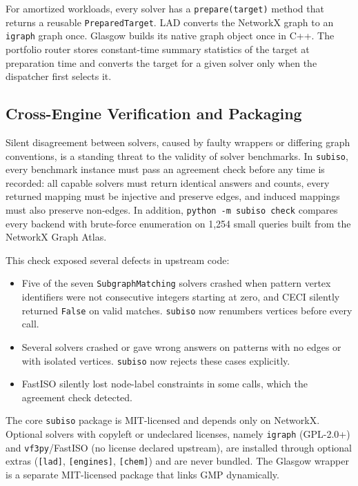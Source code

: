 \documentclass[11pt,a4paper]{article}
\begin{document}
For amortized workloads, every solver has a \texttt{prepare(target)} method that returns a reusable \texttt{PreparedTarget}. LAD converts the NetworkX graph to an \texttt{igraph} graph once. Glasgow builds its native graph object once in C++. The portfolio router stores constant-time summary statistics of the target at preparation time and converts the target for a given solver only when the dispatcher first selects it.

\subsection{Cross-Engine Verification and Packaging}

Silent disagreement between solvers, caused by faulty wrappers or differing graph conventions, is a standing threat to the validity of solver benchmarks. In \texttt{subiso}, every benchmark instance must pass an agreement check before any time is recorded: all capable solvers must return identical answers and counts, every returned mapping must be injective and preserve edges, and induced mappings must also preserve non-edges. In addition, \texttt{python -m subiso check} compares every backend with brute-force enumeration on 1,254 small queries built from the NetworkX Graph Atlas.

This check exposed several defects in upstream code:
\begin{itemize}
    \item Five of the seven \texttt{SubgraphMatching} solvers crashed when pattern vertex identifiers were not consecutive integers starting at zero, and CECI silently returned \texttt{False} on valid matches. \texttt{subiso} now renumbers vertices before every call.
    \item Several solvers crashed or gave wrong answers on patterns with no edges or with isolated vertices. \texttt{subiso} now rejects these cases explicitly.
    \item FastISO silently lost node-label constraints in some calls, which the agreement check detected.
\end{itemize}

The core \texttt{subiso} package is MIT-licensed and depends only on NetworkX. Optional solvers with copyleft or undeclared licenses, namely \texttt{igraph} (GPL-2.0+) and \texttt{vf3py}/FastISO (no license declared upstream), are installed through optional extras (\texttt{[lad]}, \texttt{[engines]}, \texttt{[chem]}) and are never bundled. The Glasgow wrapper is a separate MIT-licensed package that links GMP dynamically.
\end{document}
